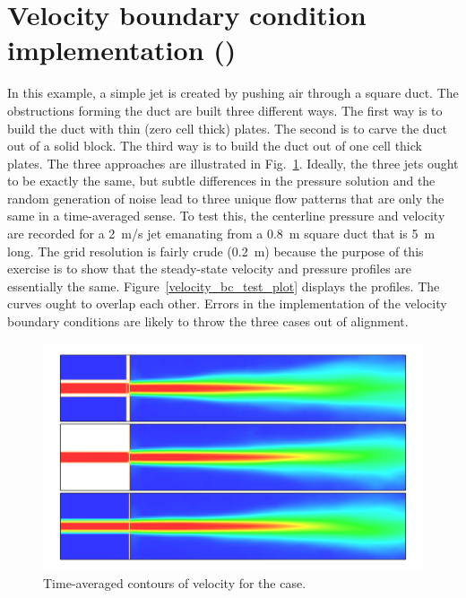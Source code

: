 \documentclass[11pt]{book}
\begin{document}
\newpage

\section{Velocity boundary condition implementation (\texorpdfstring{}{velocity\_bc\_test})}
\label{velocity_bc_test}

In this example, a simple jet is created by pushing air through a square duct. The obstructions forming the duct are built three different ways. The first way is to build the duct with thin (zero cell thick) plates. The second is to carve the duct out of a solid block. The third way is to build the duct out of one cell thick plates. The three approaches are illustrated in Fig.~\ref{velocity_bc_test_image}. Ideally, the three jets ought to be exactly the same, but subtle differences in the pressure solution and the random generation of noise lead to three unique flow patterns that are only the same in a time-averaged sense. To test this, the centerline pressure and velocity are recorded for a 2~m/s jet emanating from a 0.8~m square duct that is 5~m long. The grid resolution is fairly crude (0.2~m) because the purpose of this exercise is to show that the steady-state velocity and pressure profiles are essentially the same. Figure~\ref{velocity_bc_test_plot} displays the profiles. The curves ought to overlap each other. Errors in the implementation of the velocity boundary conditions are likely to throw the three cases out of alignment.

\begin{figure}[!ht]
\centering
\includegraphics[width=\textwidth]{SCRIPT_FIGURES/velocity_bc_test}
\caption[Images of the  test case]{Time-averaged contours of velocity for the  case.}
\label{velocity_bc_test_image}
\end{figure}
\end{document}
